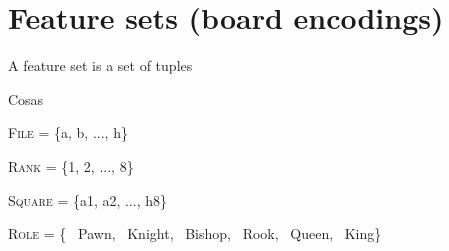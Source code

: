 \newcommand{\white}{\fullmoon}
\newcommand{\black}{\newmoon}

\newcommand{\bigtimes}{\mathop{\raisebox{-0.5ex}{\scalebox{2}{$\times$}}}}

\newcommand{\pieceBoard}{
    \newcount\pieceindex
    \setcounter{pieceindex}{0}
    \raisebox{-7ex}{
        \centering
        \chessboard[
            tinyboard,
            showmover=false,
            margin=false,
            padding=false,
            hlabel=false,
            vlabel=false,
            pgfstyle={text},
            text=\fontsize{1.2ex}{1.2ex}\bfseries\sffamily \currentwq,
            markboard
        ]
    }
}
\newcommand{\pieceRolesTable}{
    \begin{tabular}{|l|}
        \hline
        \sympawn\ Pawn \\
        \hline
        \symknight\ Knight \\
        \hline
        \symbishop\ Bishop \\
        \hline
        \symrook\ Rook \\
        \hline
        \symqueen\ Queen \\
        \hline
        \symking\ King \\
        \hline
    \end{tabular}
}
\newcommand{\pieceColorsTable}{
    \begin{tabular}{|l|}
        \hline
        $\white$ White \\
        \hline
        $\black$ Black \\
        \hline
    \end{tabular}
}

\newcommand{\fs}[1]{\textsc{#1}}


\section{Feature sets (board encodings)}

A feature set is a set of tuples 

Cosas

\fs{File} = \{a, b, ..., h\}

\fs{Rank} = \{1, 2, ..., 8\}

\fs{Square} = \{a1, a2, ..., h8\}

\fs{Role} = \{
    \sympawn\ Pawn,
    \symknight\ Knight,
    \symbishop\ Bishop,
    \symrook\ Rook,
    \symqueen\ Queen,
    \symking\ King\}


